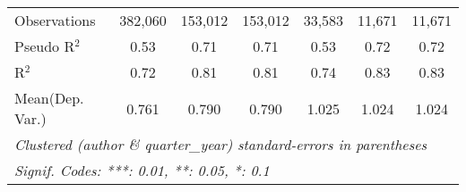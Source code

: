 \begin{tabular}{lcccccc}
   Observations         & 382,060       & 153,012       & 153,012        & 33,583        & 11,671       & 11,671\\  
   Pseudo R$^2$         & 0.53          & 0.71          & 0.71           & 0.53          & 0.72         & 0.72\\  
   R$^2$                & 0.72          & 0.81          & 0.81           & 0.74          & 0.83         & 0.83\\  
Mean(Dep. Var.) & 0.761 & 0.790 & 0.790 & 1.025 & 1.024 & 1.024 \\
   \midrule \midrule
   \multicolumn{7}{l}{\emph{Clustered (author \& quarter\_year) standard-errors in parentheses}}\\
   \multicolumn{7}{l}{\emph{Signif. Codes: ***: 0.01, **: 0.05, *: 0.1}}\\
\end{tabular}
\par\endgroup
